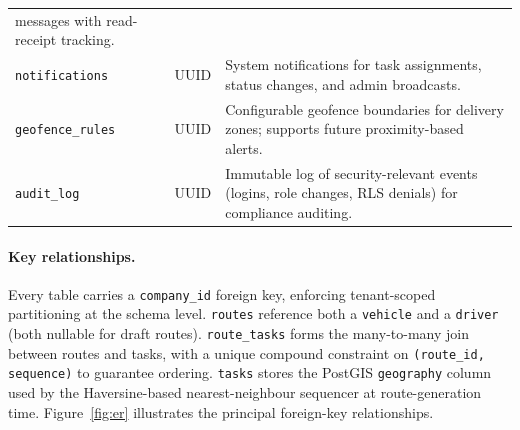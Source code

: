 \begin{table}[ht]
\begin{tabularx}{\textwidth}{l l X}
                                          messages with read-receipt tracking. \\
    \texttt{notifications}      & UUID & System notifications for task assignments, status changes,
                                          and admin broadcasts. \\
    \texttt{geofence\_rules}    & UUID & Configurable geofence boundaries for delivery zones;
                                          supports future proximity-based alerts. \\
    \texttt{audit\_log}         & UUID & Immutable log of security-relevant events (logins, role
                                          changes, RLS denials) for compliance auditing. \\
    \bottomrule
  \end{tabularx}
\end{table}

\paragraph{Key relationships.}
Every table carries a \texttt{company\_id} foreign key, enforcing
tenant-scoped partitioning at the schema level.  \texttt{routes} reference
both a \texttt{vehicle} and a \texttt{driver} (both nullable for draft
routes).  \texttt{route\_tasks} forms the many-to-many join between routes
and tasks, with a unique compound constraint on
\texttt{(route\_id, sequence)} to guarantee ordering.  \texttt{tasks} stores
the PostGIS \texttt{geography} column used by the Haversine-based
nearest-neighbour sequencer at route-generation time.
Figure~\ref{fig:er} illustrates the principal foreign-key relationships.

